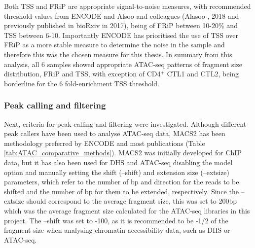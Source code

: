 Both TSS and FRiP are appropriate signal-to-noise measures, with recommended threshold values from ENCODE and Alsoo and colleagues (Alasoo , 2018 and previously published in bioRxiv in 2017), being of FRiP between 10-20\% and TSS between 6-10. Importantly ENCODE has prioritised the use of TSS over FRiP as a more stable measure to determine the noise in the sample and therefore this was the chosen measure for this thesis. In summary from this analysis, all 6 samples showed appropriate ATAC-seq patterns of fragment size distribution, FRiP and TSS, with exception of CD4$^+$ CTL1 and CTL2, being borderline for the 6 fold-enrichment TSS threshold. 
	

\subsubsection{Peak calling and filtering}
\label{peak_filtering}
Next, criteria for peak calling and filtering were investigated. Although different peak callers have been used to analyse ATAC-seq data, MACS2 has been methodology preferred by ENCODE and most publications (Table \ref{tab:ATAC_comparative_methods}). MACS2 was initially developed for ChIP data, but it has also been used for DHS and ATAC-seq disabling the model option and manually setting the shift (--shift) and extension size (--extsize) parameters, which refer to the number of bp and direction for the reads to be shifted and the number of bp for them to be extended, respectively. Since the --extsize should correspond to the average fragment size, this was set to 200bp which was the average fragment size calculated for the ATAC-seq libraries in this project. The --shift was set to -100, as it is recommended to be -1/2 of the fragment size when analysing chromatin accessibility data, such as DHS or ATAC-seq. 

